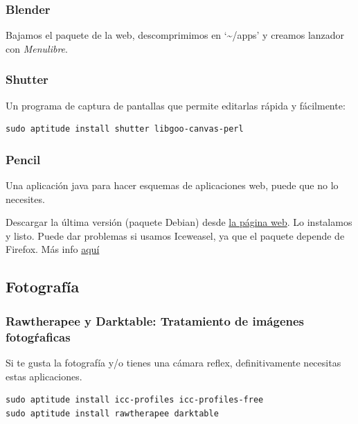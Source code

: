 \documentclass[12pt,spanish,]{scrartcl}
\begin{document}
\hypertarget{blender}{%
\subsubsection{Blender}\label{blender}}

Bajamos el paquete de la web, descomprimimos en `\textasciitilde{}/apps'
y creamos lanzador con \emph{Menulibre}.

\hypertarget{shutter}{%
\subsubsection{Shutter}\label{shutter}}

Un programa de captura de pantallas que permite editarlas rápida y
fácilmente:

\begin{verbatim}
sudo aptitude install shutter libgoo-canvas-perl
\end{verbatim}

\hypertarget{pencil}{%
\subsubsection{Pencil}\label{pencil}}

Una aplicación java para hacer esquemas de aplicaciones web, puede que
no lo necesites.

Descargar la última versión (paquete Debian) desde
\href{http://pencil.evolus.vn/}{la página web}. Lo instalamos y listo.
Puede dar problemas si usamos Iceweasel, ya que el paquete depende de
Firefox. Más info
\href{https://www.linuxwebzone.com/install-pencil-on-debian/}{aquí}

\hypertarget{fotografuxeda}{%
\subsection{Fotografía}\label{fotografuxeda}}

\hypertarget{rawtherapee-y-darktable-tratamiento-de-imuxe1genes-fotogux155aficas}{%
\subsubsection{Rawtherapee y Darktable: Tratamiento de imágenes
fotogŕaficas}\label{rawtherapee-y-darktable-tratamiento-de-imuxe1genes-fotogux155aficas}}

Si te gusta la fotografía y/o tienes una cámara reflex, definitivamente
necesitas estas aplicaciones.

\begin{verbatim}
sudo aptitude install icc-profiles icc-profiles-free
sudo aptitude install rawtherapee darktable
\end{verbatim}
\end{document}
